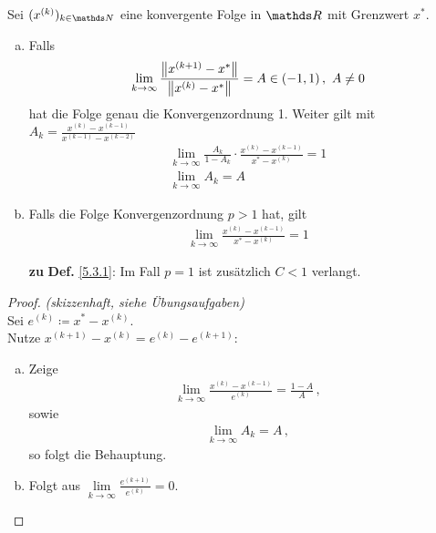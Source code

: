 \begin{Leme}
	\label{5.3.5}
	Sei $(x^{(k)})_{k\in\N}$ eine konvergente Folge in $\R$ mit Grenzwert $x^{*}$.
	\begin{enumerate}[a)]
		\item Falls 
		\begin{gather}
		\lim\limits_{k\rightarrow \infty}\frac{\left\| x^{(k+1)}-x^{*} \right\|}{\left\| x^{(k)}-x^{*} \right\|}=
		A\in (-1,1)\, ,~ A\neq 0
		\label{V.3.1}
		\end{gather}
		hat die Folge genau die Konvergenzordnung 1.
		Weiter gilt mit $A_k=\frac{x^{(k)}-x^{(k-1)}}{x^{(k-1)}-x^{(k-2)}}$
		\begin{gather}
		\lim\limits_{k\rightarrow \infty}\frac{A_k}{1-A_k}\cdot 
		\frac{x^{(k)}-x^{(k-1)}}{x^{*}-x^{(k)}}=1 
		\label{V.3.2}
		\\ \nonumber
		\lim\limits_{k\rightarrow\infty}A_k=A
		\end{gather}
		\item Falls die Folge Konvergenzordnung $p>1$ hat, gilt
		\begin{gather}
		\lim\limits_{k\rightarrow\infty}\frac{x^{(k)}-x^{(k-1)}}{x^{*}-x^{(k)}}=1
		\label{V.3.3}
		\end{gather}
		\item[\textbf{zu}]\textbf{Def.} \ref{5.3.1}:  Im Fall $p=1$ ist zusätzlich $C<1 $ verlangt.
	\end{enumerate}
\end{Leme} 

\begin{proof}
	\textit{(skizzenhaft, siehe Übungsaufgaben)}\\
	Sei $e^{(k)}\coloneqq x^{*}-x^{(k)}$.\\
	Nutze $x^{(k+1)}-x^{(k)} = e^{(k)}-e^{(k+1)}$:
	\begin{enumerate}[a)]
		\item Zeige 
		\begin{gather*} 
		\lim\limits_{k\rightarrow\infty}\frac{x^{(k)}-x^{(k-1)}}{e^{(k)}} = \frac{1-A}{A}\, ,
		\end{gather*}
		sowie
		\begin{gather*}
		\lim\limits_{k\rightarrow \infty}A_k = A \, ,
		\end{gather*}
		so folgt die Behauptung.
		\item Folgt aus $\lim\limits_{k\rightarrow\infty} \frac{e^{(k+1)}}{e^{(k)}} =0$.
	\end{enumerate}
\end{proof}

